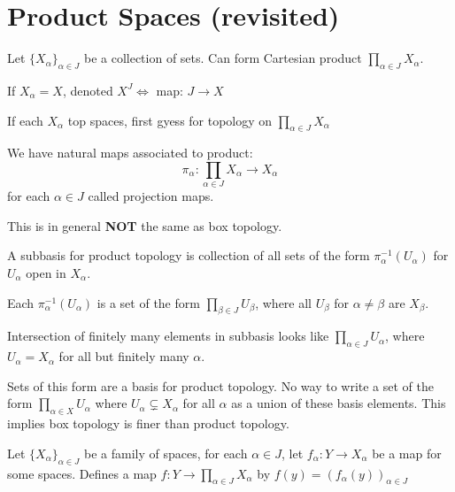 \section{Product Spaces (revisited)}
Let $\{X_\alpha\}_{\alpha \in J}$ be a collection of sets. Can form Cartesian product $\displaystyle\prod_{\alpha \in J} X_\alpha$.

If $X_\alpha=X$, denoted $X^J \iff$ map: $J \to X$

If each $X_\alpha$ top spaces, first gyess for topology on $\displaystyle\prod_{\alpha \in J}X_\alpha$


We have natural maps associated to product:
\[\pi_\alpha: \prod_{\alpha \in J} X_\alpha \to X_\alpha\] for each $\alpha \in J$ called projection maps.

This is in general {\bf NOT} the same as box topology.

A subbasis for product topology is collection of all sets of the form $\pi_\alpha^{-1}(U_\alpha)$ for $U_\alpha$ open in $X_\alpha$.

Each $\pi_{\alpha}^{-1}(U_\alpha)$ is a set of the form $\displaystyle\prod_{\beta \in J}U_\beta$, where all $U_\beta$ for $\alpha \neq \beta$ are $X_\beta$.

Intersection of finitely many elements in subbasis looks like $\displaystyle\prod_{\alpha \in J}U_\alpha$,
where $U_\alpha=X_\alpha$ for all but finitely many $\alpha$.

Sets of this form are a basis for product topology. No way to write a set of the form $\displaystyle\prod_{\alpha \in X}U_\alpha$ where $U_\alpha \subsetneq X_\alpha$ for all $\alpha$ as a union of these basis elements.
This implies box topology is finer than product topology.

Let $\{X_\alpha\}_{\alpha \in J}$ be a family of spaces, for each $\alpha \in J$, let $f_\alpha: Y \to X_\alpha$ be a map for some spaces. Defines a map $f:Y \to \displaystyle\prod_{\alpha \in J}X_\alpha$ by $f(y)=(f_\alpha(y))_{\alpha \in J}$


